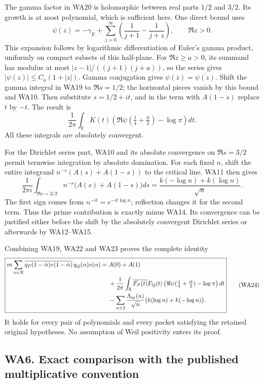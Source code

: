 \documentclass[
  10pt,
  a4paper,
]{article}
\begin{document}
The gamma factor in WA20 is holomorphic between real parts \(1/2\) and
\(3/2\). Its growth is at most polynomial, which is sufficient here. One
direct bound uses \[
\psi(z)=-\gamma_E+\sum_{j=0}^\infty
\left(\frac1{j+1}-\frac1{j+z}\right),\qquad \Re z>0.
\tag{WA21}
\] This expansion follows by logarithmic differentiation of Euler's
gamma product, uniformly on compact subsets of this half-plane. For
\(\Re z\ge a>0\), its summand has modulus at most
\(|z-1|/((j+1)(j+a))\), so the series gives \(|\psi(z)|\le C_a(1+|z|)\).
Gamma conjugation gives \(\psi(\bar z)=\overline{\psi(z)}\). Shift the
gamma integral in WA19 to \(\Re s=1/2\); the horizontal pieces vanish by
this bound and WA10. Then substitute \(s=1/2+it\), and in the term with
\(A(1-s)\) replace \(t\) by \(-t\). The result is \[
\frac1{2\pi}\int_{\mathbb R}K(t)
\left(\Re\psi(\tfrac14+\tfrac{it}2)-\log\pi\right)dt.
\tag{WA22}
\] All these integrals are absolutely convergent.

For the Dirichlet series part, WA10 and its absolute convergence on
\(\Re s=3/2\) permit termwise integration by absolute domination. For
each fixed \(n\), shift the entire integrand \(n^{-s}(A(s)+A(1-s))\) to
the critical line. WA11 then gives \[
\frac1{2\pi i}\int_{\Re s=3/2}n^{-s}
\bigl(A(s)+A(1-s)\bigr)ds
=\frac{k(-\log n)+k(\log n)}{\sqrt n}.
\tag{WA23}
\] The first sign comes from \(n^{-it}=e^{-it\log n}\); reflection
changes it for the second term. Thus the prime contribution is exactly
minus WA14. Its convergence can be justified either before the shift by
the absolutely convergent Dirichlet series or afterwards by WA12--WA15.

Combining WA19, WA22 and WA23 proves the complete identity \[
\boxed{\begin{aligned}
m\sum_{\alpha\in\mathcal R}
\overline{q_P(1-\bar\alpha)v(1-\bar\alpha)}\,q_Q(\alpha)v(\alpha)
={}&A(0)+A(1)\\
&+\frac1{2\pi}\int_{\mathbb R}\overline{F_P(t)}F_Q(t)
\left(\Re\psi(\tfrac14+\tfrac{it}2)-\log\pi\right)dt\\
&-\sum_{n\ge2}\frac{\Lambda_{\rm ar}(n)}{\sqrt n}
\bigl(k(\log n)+k(-\log n)\bigr).
\end{aligned}}
\tag{WA24}
\] It holds for every pair of polynomials and every packet satisfying
the retained original hypotheses. No assumption of Weil positivity
enters its proof.

\subsection{WA6. Exact comparison with the published multiplicative
convention}\label{wa6.-exact-comparison-with-the-published-multiplicative-convention}
\end{document}

